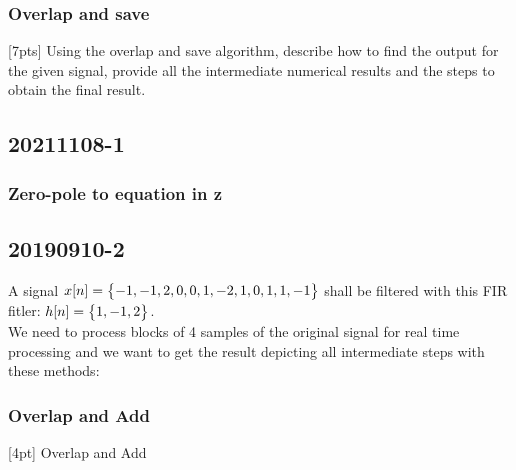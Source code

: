     \subsubsection{Overlap and save}
    [7pts] Using the overlap and save algorithm, describe how to find the output for the given signal, provide all the intermediate numerical results and the steps to obtain the final result.


\pagebreak\subsection{20211108-1}

    \subsubsection{Zero-pole to equation in z}


\pagebreak\subsection{20190910-2}
    A signal $x[n]=\begin{Bmatrix} {-1,-1,2,0,0,1,-2,1,0,1,1,-1} \end{Bmatrix}$ shall be filtered with this FIR fitler: $h[n]=\begin{Bmatrix} {1,-1,2} \end{Bmatrix}$.\\
    We need to process blocks of 4 samples of the original signal for real time processing and we want to get the result depicting all intermediate steps with these methods:

    \subsubsection{Overlap and Add}
    [4pt] Overlap and Add

